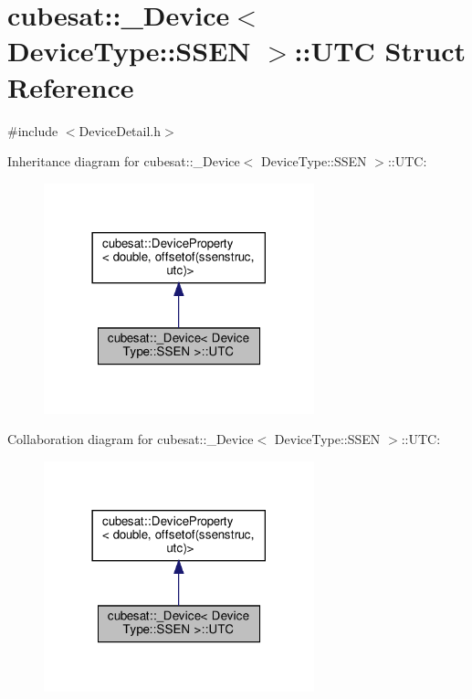 \hypertarget{structcubesat_1_1__Device_3_01DeviceType_1_1SSEN_01_4_1_1UTC}{}\section{cubesat\+:\+:\+\_\+\+Device$<$ Device\+Type\+:\+:S\+S\+EN $>$\+:\+:U\+TC Struct Reference}
\label{structcubesat_1_1__Device_3_01DeviceType_1_1SSEN_01_4_1_1UTC}


{\ttfamily \#include $<$Device\+Detail.\+h$>$}



Inheritance diagram for cubesat\+:\+:\+\_\+\+Device$<$ Device\+Type\+:\+:S\+S\+EN $>$\+:\+:U\+TC\+:\nopagebreak
\begin{figure}[H]
\begin{center}
\leavevmode
\includegraphics[width=222pt]{structcubesat_1_1__Device_3_01DeviceType_1_1SSEN_01_4_1_1UTC__inherit__graph}
\end{center}
\end{figure}


Collaboration diagram for cubesat\+:\+:\+\_\+\+Device$<$ Device\+Type\+:\+:S\+S\+EN $>$\+:\+:U\+TC\+:\nopagebreak
\begin{figure}[H]
\begin{center}
\leavevmode
\includegraphics[width=222pt]{structcubesat_1_1__Device_3_01DeviceType_1_1SSEN_01_4_1_1UTC__coll__graph}
\end{center}
\end{figure}
